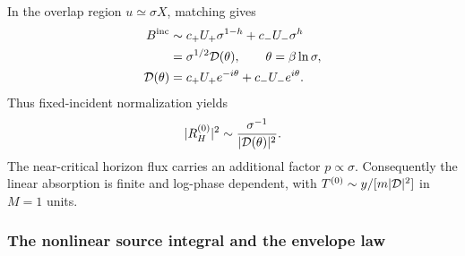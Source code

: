 In the overlap region $u\simeq\sigma X$, matching gives
\begin{align}
B^{\rm inc}&\sim c_+U_+\sigma^{1-h}+c_-U_-\sigma^h\nonumber\\
&=\sigma^{1/2}{\cal D}(\theta),\qquad\theta=\beta\ln\sigma,\nonumber\\
{\cal D}(\theta)&=c_+U_+e^{-i\theta}+c_-U_-e^{i\theta}.
\label{eq:principal-incidence}
\end{align}
Thus fixed-incident normalization yields
\begin{equation}
|R_H^{(0)}|^2\sim\frac{\sigma^{-1}}{|{\cal D}(\theta)|^2}.
\label{eq:principal-density}
\end{equation}
The near-critical horizon flux carries an additional factor $p\propto\sigma$.
Consequently the linear absorption is finite and log-phase dependent, with
$T^{(0)}\sim y/[m|{\cal D}|^2]$ in $M=1$ units.

\subsubsection{The nonlinear source integral and the envelope law}


